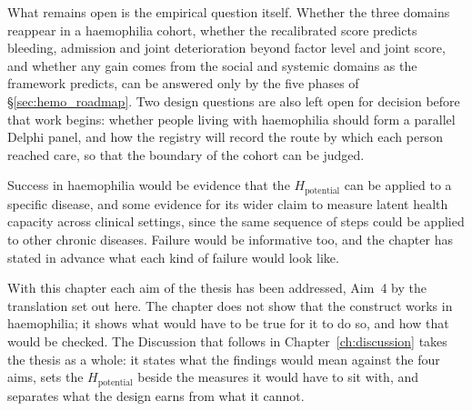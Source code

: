 What remains open is the empirical question itself. Whether the three domains reappear in a haemophilia cohort, whether the recalibrated score predicts bleeding, admission and joint deterioration beyond factor level and joint score, and whether any gain comes from the social and systemic domains as the framework predicts, can be answered only by the five phases of \S\ref{sec:hemo_roadmap}. Two design questions are also left open for decision before that work begins: whether people living with haemophilia should form a parallel Delphi panel, and how the registry will record the route by which each person reached care, so that the boundary of the cohort can be judged.

Success in haemophilia would be evidence that the $H_{\text{potential}}$ can be applied to a specific disease, and some evidence for its wider claim to measure latent health capacity across clinical settings, since the same sequence of steps could be applied to other chronic diseases. Failure would be informative too, and the chapter has stated in advance what each kind of failure would look like.

With this chapter each aim of the thesis has been addressed, Aim~4 by the translation set out here. The chapter does not show that the construct works in haemophilia; it shows what would have to be true for it to do so, and how that would be checked. The Discussion that follows in Chapter~\ref{ch:discussion} takes the thesis as a whole: it states what the findings would mean against the four aims, sets the $H_{\text{potential}}$ beside the measures it would have to sit with, and separates what the design earns from what it cannot.
